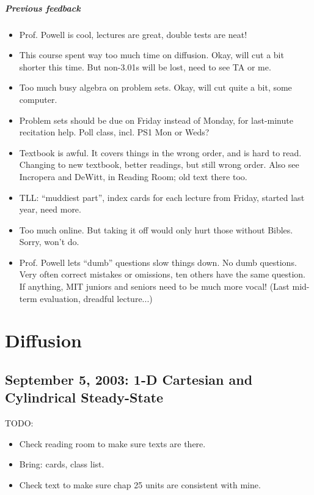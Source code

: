 \documentclass{report}
\begin{document}
\paragraph{Previous feedback}

\begin{itemize}
\item Prof. Powell is cool, lectures are great, double tests are neat!
\item This course spent way too much time on diffusion.  Okay, will cut a bit
  shorter this time.  But non-3.01s will be lost, need to see TA or me.
\item Too much busy algebra on problem sets.  Okay, will cut quite a bit, some
  computer.
\item Problem sets should be due on Friday instead of Monday, for last-minute
  recitation help.  Poll class, incl. PS1 Mon or Weds?
\item Textbook is awful.  It covers things in the wrong order, and is hard to
  read.  Changing to new textbook, better readings, but still wrong order.
  Also see Incropera and DeWitt, in Reading Room; old text there too.
\item TLL: ``muddiest part'', index cards for each lecture from Friday, started
  last year, need more.
\item Too much online.  But taking it off would only hurt those without
  Bibles.  Sorry, won't do.
\item Prof. Powell lets ``dumb'' questions slow things down.  No dumb
  questions.  Very often correct mistakes or omissions, ten others have the
  same question.  If anything, MIT juniors and seniors need to be much more
  vocal!  (Last mid-term evaluation, dreadful lecture...)
\end{itemize}
\newpage


\chapter{Diffusion}

\section{September 5, 2003: 1-D Cartesian and Cylindrical Steady-State}
\label{diff1dss}

TODO:
\begin{itemize}
\item Check reading room to make sure texts are there.
\item Bring: cards, class list.
\item Check text to make sure chap 25 units are consistent with mine.
\end{itemize}
\end{document}
